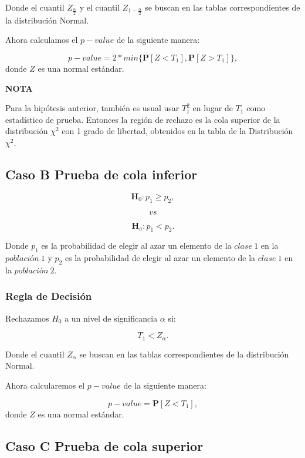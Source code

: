 \documentclass[
  a4paper,
  oneside,
  openany]{book}
\begin{document}
Donde el cuantil \(Z_\frac{\alpha}{2}\) y el cuantil \(Z_{1-\frac{\alpha}{2}}\) se buscan en las tablas correspondientes de la distribución Normal.

Ahora calculamos el \(p-value\) de la siguiente manera:

\[p-value=2*min\{ \mathbf{P}[Z<T_{1}],\mathbf{P}[Z>T_{1}]\},\]
donde \(Z\) es una normal estándar.

\textbf{NOTA}

Para la hipótesis anterior, también es usual usar \(T_{1}^2\) en lugar de \(T_{1}\) como estadístico de prueba. Entonces la región de rechazo es la cola superior de la distribución \(\chi^2\) con 1 grado de libertad, obtenidos en la tabla de la Distribución \(\chi^2\).

\hypertarget{caso-b-prueba-de-cola-inferior-6}{%
\subsection*{Caso B Prueba de cola inferior}\label{caso-b-prueba-de-cola-inferior-6}}


\[\textbf{H}_0: p_{1} \geq p_{2},\]

\[vs\]

\[\textbf{H}_a: p_{1} < p_{2}.\]

Donde \(p_{1}\) es la probabilidad de elegir al azar un elemento de la \(clase\ 1\) en la \(población\ 1\) y \(p_{2}\) es la probabilidad de elegir al azar un elemento de la \(clase\ 1\) en la \(población\ 2\).

\hypertarget{regla-de-decisiuxf3n-22}{%
\subsubsection*{Regla de Decisión}\label{regla-de-decisiuxf3n-22}}


Rechazamos \(H_0\) a un nivel de significancia \(\alpha\) si:

\[T_{1}< Z_{\alpha}.\]

Donde el cuantil \(Z_{\alpha}\) se buscan en las tablas correspondientes de la distribución Normal.

Ahora calcularemos el \(p-value\) de la siguiente manera:

\[p-value=\mathbf{P}[Z<T_{1}],\]
donde \(Z\) es una normal estándar.

\hypertarget{caso-c-prueba-de-cola-superior-6}{%
\subsection*{Caso C Prueba de cola superior}\label{caso-c-prueba-de-cola-superior-6}}
\end{document}
